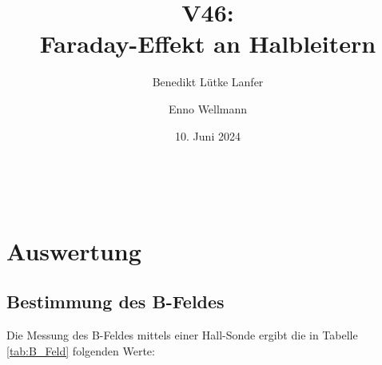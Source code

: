 

\title{V46:\\ Faraday-Effekt an Halbleitern}
\author{Benedikt Lütke Lanfer \and Enno Wellmann}
\date{10. Juni 2024}
\publishers{TU Dortmund – Fakultät Physik}


\let\t\text\


\tableofcontents
\newpage





\section{Auswertung}
\subsection{Bestimmung des B-Feldes}
Die Messung des B-Feldes mittels einer Hall-Sonde ergibt die in Tabelle
\eqref{tab:B_Feld} folgenden Werte:

